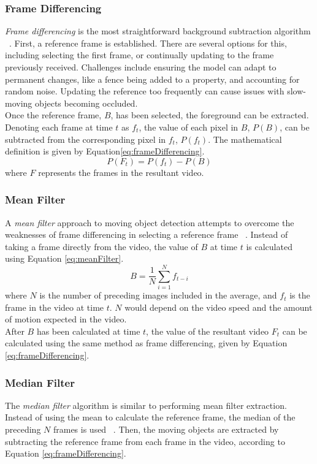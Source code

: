 \subsubsection{Frame Differencing}
\indent \indent
\textit{Frame differencing} is the most straightforward background subtraction algorithm ~\cite{FrameDifferencing}. First, a reference frame is established. There are several options for this, including selecting the first frame, or continually updating to the frame previously received. Challenges include ensuring the model can adapt to permanent changes, like a fence being added to a property, and accounting for random noise. Updating the reference too frequently can cause issues with slow-moving objects becoming occluded.
\smallskip \\ \indent
Once the reference frame, $B$, has been selected, the foreground can be extracted. Denoting each frame at time $t$ as $f_t$, the value of each pixel in $B$, $P(B)$, can be subtracted from the corresponding pixel in $f_t$, $P(f_t)$. The mathematical definition is given by Equation\ref{eq:frameDifferencing}.
\begin{equation}
    \label{eq:frameDifferencing}
    P(F_t) = P(f_t) - P(B)
\end{equation}
where $F$ represents the frames in the resultant video.
\subsubsection{Mean Filter}
\indent \indent
A \textit{mean filter} approach to moving object detection attempts to overcome the weaknesses of frame differencing in selecting a reference frame ~\cite{MeanFilter}. Instead of taking a frame directly from the video, the value of $B$ at time $t$ is calculated using Equation \ref{eq:meanFilter}.
\begin{equation}
    \label{eq:meanFilter}
    B = \frac{1}{N} \sum^N_{i=1} f_{t-i}
\end{equation}
where $N$ is the number of preceding images included in the average, and $f_t$ is the frame in the video at time $t$. $N$ would depend on the video speed and the amount of motion expected in the video.
\smallskip \\ \indent
After $B$ has been calculated at time $t$, the value of the resultant video $F_t$ can be calculated using the same method as frame differencing, given by Equation \ref{eq:frameDifferencing}.
\subsubsection{Median Filter}
\indent \indent
The \textit{median filter} algorithm is similar to performing mean filter extraction. Instead of using the mean to calculate the reference frame, the median of the preceding $N$ frames is used ~\cite{MeanFilter}. Then, the moving objects are extracted by subtracting the reference frame from each frame in the video, according to Equation \ref{eq:frameDifferencing}.
